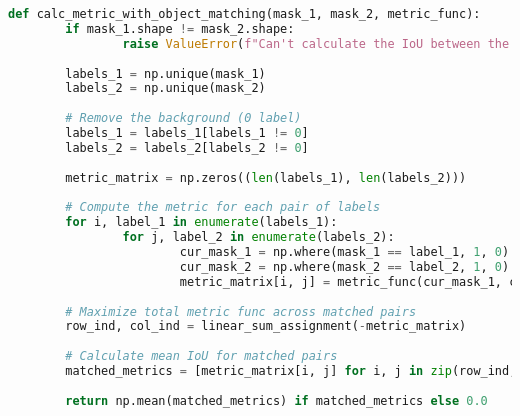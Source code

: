 		\begin{lstlisting}[language=Python,caption=Calculate the mean \acl{iou} between two mask images using mask matching, label=lst:mask-matching]
def calc_metric_with_object_matching(mask_1, mask_2, metric_func):
		if mask_1.shape != mask_2.shape:
				raise ValueError(f"Can't calculate the IoU between the 2 masks because of different shapes: {mask_1.shape} and {mask_2.shape}")
		
		labels_1 = np.unique(mask_1)
		labels_2 = np.unique(mask_2)
		
		# Remove the background (0 label)
		labels_1 = labels_1[labels_1 != 0]
		labels_2 = labels_2[labels_2 != 0]
		
		metric_matrix = np.zeros((len(labels_1), len(labels_2)))
		
		# Compute the metric for each pair of labels
		for i, label_1 in enumerate(labels_1):
				for j, label_2 in enumerate(labels_2):
						cur_mask_1 = np.where(mask_1 == label_1, 1, 0)
						cur_mask_2 = np.where(mask_2 == label_2, 1, 0)
						metric_matrix[i, j] = metric_func(cur_mask_1, cur_mask_2)
		
		# Maximize total metric func across matched pairs
		row_ind, col_ind = linear_sum_assignment(-metric_matrix)
		
		# Calculate mean IoU for matched pairs
		matched_metrics = [metric_matrix[i, j] for i, j in zip(row_ind, 
																																	col_ind)]
		return np.mean(matched_metrics) if matched_metrics else 0.0
		\end{lstlisting}
		
		
	
	
	\clearpage
